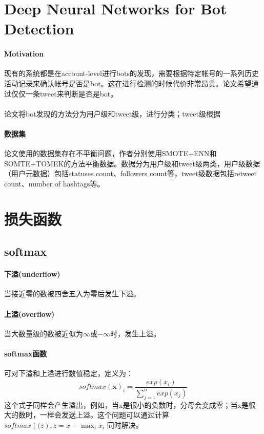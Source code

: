 \documentclass[10pt,letterpaper]{article}
\begin{document}
\newpage
\section{Deep Neural Networks for Bot Detection\cite{kudugunta2018bot}}

\paragraph{Motivation} 现有的系统都是在account-level进行bots的发现，需要根据特定帐号的一系列历史活动记录来确认帐号是否是bot。这在进行检测的时候代价非常昂贵。论文希望通过仅仅一条tweet来判断是否是bot。

\paragraph{} 论文将bot发现的方法分为用户级和tweet级，进行分类；tweet级根据
\paragraph{数据集} 论文使用的数据集存在不平衡问题，作者分别使用SMOTE+ENN和SOMTE+TOMEK的方法平衡数据。数据分为用户级和tweet级两类，用户级数据（用户元数据）包括statuses count、followers count等，tweet级数据包括retweet count、number of hashtags等。

\newpage
\section{损失函数}
\subsection{softmax}
\paragraph{下溢(underflow)} 当接近零的数被四舍五入为零后发生下溢。
\paragraph{上溢(overflow)} 当大数量级的数被近似为$\infty$或$-\infty$时，发生上溢。 
\paragraph{softmax函数}可对下溢和上溢进行数值稳定，定义为：
\begin{equation}
	softmax(\mathbf{x})_i = \frac{exp(x_i)}{\sum^n_{j=1}exp(x_j)}
\end{equation}
这个式子同样会产生溢出，例如，当x是很小的负数时，分母会变成零；当x是很大的数时，一样会发送上溢。这个问题可以通过计算$softmax(\mathbf(z), z=x-\max_ix_i$ 同时解决。
\end{document}
